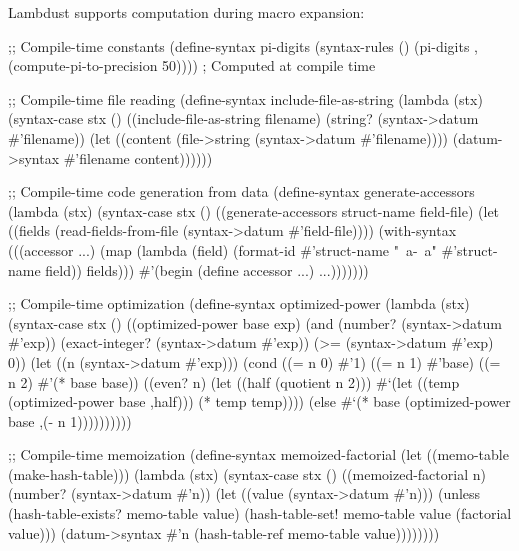 Lambdust supports computation during macro expansion:

\begin{example}
\begin{lambdustcode}
;; Compile-time constants
(define-syntax pi-digits
  (syntax-rules ()
    (pi-digits 
      ,(compute-pi-to-precision 50))))  ; Computed at compile time

;; Compile-time file reading
(define-syntax include-file-as-string
  (lambda (stx)
    (syntax-case stx ()
      ((include-file-as-string filename)
       (string? (syntax->datum #'filename))
       (let ((content (file->string (syntax->datum #'filename))))
         (datum->syntax #'filename content))))))

;; Compile-time code generation from data  
(define-syntax generate-accessors
  (lambda (stx)
    (syntax-case stx ()
      ((generate-accessors struct-name field-file)
       (let ((fields (read-fields-from-file (syntax->datum #'field-file))))
         (with-syntax (((accessor ...) 
                        (map (lambda (field)
                               (format-id #'struct-name "~a-~a" 
                                         #'struct-name field))
                             fields)))
           #'(begin
               (define accessor ...) ...)))))))

;; Compile-time optimization
(define-syntax optimized-power
  (lambda (stx)
    (syntax-case stx ()
      ((optimized-power base exp)
       (and (number? (syntax->datum #'exp))
            (exact-integer? (syntax->datum #'exp))
            (>= (syntax->datum #'exp) 0))
       (let ((n (syntax->datum #'exp)))
         (cond
           ((= n 0) #'1)
           ((= n 1) #'base)
           ((= n 2) #'(* base base))
           ((even? n) 
            (let ((half (quotient n 2)))
              #`(let ((temp (optimized-power base ,half)))
                  (* temp temp))))
           (else
            #`(* base (optimized-power base ,(- n 1))))))))))

;; Compile-time memoization
(define-syntax memoized-factorial
  (let ((memo-table (make-hash-table)))
    (lambda (stx)
      (syntax-case stx ()
        ((memoized-factorial n)
         (number? (syntax->datum #'n))
         (let ((value (syntax->datum #'n)))
           (unless (hash-table-exists? memo-table value)
             (hash-table-set! memo-table value (factorial value)))
           (datum->syntax #'n (hash-table-ref memo-table value))))))))
\end{lambdustcode}
\end{example}


